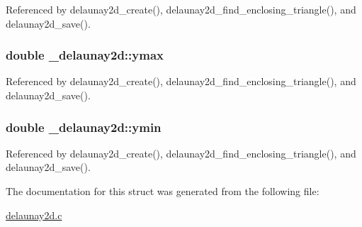 Referenced by delaunay2d\+\_\+create(), delaunay2d\+\_\+find\+\_\+enclosing\+\_\+triangle(), and delaunay2d\+\_\+save().

\subsubsection[{\texorpdfstring{ymax}{ymax}}]{\setlength{\rightskip}{0pt plus 5cm}double \+\_\+delaunay2d\+::ymax}\hypertarget{struct__delaunay2d_a59956cb6ab3c7d581c8e6bb15eeeb8fb}{}\label{struct__delaunay2d_a59956cb6ab3c7d581c8e6bb15eeeb8fb}


Referenced by delaunay2d\+\_\+create(), delaunay2d\+\_\+find\+\_\+enclosing\+\_\+triangle(), and delaunay2d\+\_\+save().

\subsubsection[{\texorpdfstring{ymin}{ymin}}]{\setlength{\rightskip}{0pt plus 5cm}double \+\_\+delaunay2d\+::ymin}\hypertarget{struct__delaunay2d_a0a528fa659fd4d3752829f35258218e6}{}\label{struct__delaunay2d_a0a528fa659fd4d3752829f35258218e6}


Referenced by delaunay2d\+\_\+create(), delaunay2d\+\_\+find\+\_\+enclosing\+\_\+triangle(), and delaunay2d\+\_\+save().



The documentation for this struct was generated from the following file\+:\begin{DoxyCompactItemize}
\item 
\hyperlink{delaunay2d_8c}{delaunay2d.\+c}\end{DoxyCompactItemize}
